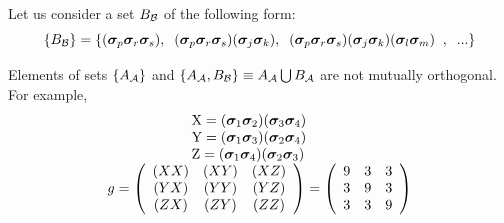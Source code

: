 \documentclass[a4paper]{jpconf}
\renewcommand\[{\begin{equation}}
\renewcommand\]{\end{equation}}
\newcommand{\ssigma}{{\bm \sigma}}
\newcommand{\A}{{\cal A}}
\newcommand{\B}{{\cal B}}
\begin{document}
Let us consider a set  ${B_\B}$ of the following form:
$$
\{ B_\B \}  = \{ ({\bf \ssigma}_p{\bf\ssigma}_r{\bf\ssigma}_s),\;\;
({\bf \ssigma}_p{\bf\ssigma}_r{\bf\ssigma}_s)({\bf \ssigma}_j{\bf\ssigma}_k), \;\;
({\bf \ssigma}_p{\bf\ssigma}_r{\bf\ssigma}_s)({\bf \ssigma}_j{\bf\ssigma}_k)({\bf \ssigma}_l{\bf\ssigma}_m)\;\;,\;\;...\}
$$

Elements of sets $\{A_\A\}$ and $\{A_\A,B_\B\}\equiv{A_\A}\bigcup{B_\A}$ are not mutually orthogonal. For example,
\[\begin{array}{l}
\qquad \qquad \quad {\rm{X = (}}{{\ssigma}_1}{{\ssigma}_2}{\rm{)(}}{{\ssigma}_3}{{\ssigma}_4}{\rm{)}}\\
\qquad \qquad \quad {\rm{Y = (}}{{\ssigma}_1}{{\ssigma}_3}{\rm{)(}}{{\ssigma}_2}{{\ssigma}_4}{\rm{)}}\\
\qquad \qquad \quad {\rm{Z = (}}{{\ssigma}_1}{{\ssigma}_4}{\rm{)(}}{{\ssigma}_2}{{\ssigma}_3}{\rm{)}}\\
g = \left( {\begin{array}{*{20}{c}}
	{(XX)}&{(XY)}&{(XZ)}\\
	{(YX)}&{(YY)}&{(YZ)}\\
	{(ZX)}&{(ZY)}&{(ZZ)}
	\end{array}} \right) = \left( {\begin{array}{*{20}{c}}
	9&3&3\\
	3&9&3\\
	3&3&9
	\end{array}} \right)
\end{array}\]
\end{document}
